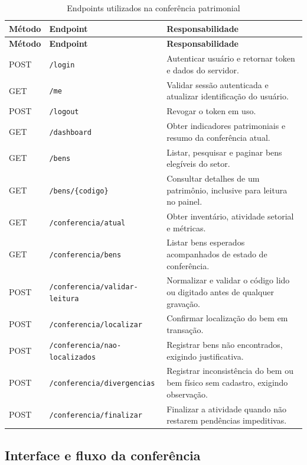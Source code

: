 \documentclass[12pt,a4paper]{article}
\begin{document}
\begin{longtable}{L{1.45cm} L{4.8cm} L{7.55cm}}
\caption{Endpoints utilizados na conferência patrimonial}
\label{tab:rotas}\\
\toprule
\textbf{Método} & \textbf{Endpoint} & \textbf{Responsabilidade} \\
\midrule
\endfirsthead
\toprule
\textbf{Método} & \textbf{Endpoint} & \textbf{Responsabilidade} \\
\midrule
\endhead
\bottomrule
\endfoot
POST & \texttt{/login} & Autenticar usuário e retornar token e dados do
servidor. \\
GET & \texttt{/me} & Validar sessão autenticada e atualizar identificação do
usuário. \\
POST & \texttt{/logout} & Revogar o token em uso. \\
GET & \texttt{/dashboard} & Obter indicadores patrimoniais e resumo da
conferência atual. \\
GET & \texttt{/bens} & Listar, pesquisar e paginar bens elegíveis do setor. \\
GET & \texttt{/bens/\{codigo\}} & Consultar detalhes de um patrimônio,
inclusive para leitura no painel. \\
GET & \texttt{/conferencia/atual} & Obter inventário, atividade setorial e
métricas. \\
GET & \texttt{/conferencia/bens} & Listar bens esperados acompanhados de
estado de conferência. \\
POST & \texttt{/conferencia/validar-leitura} & Normalizar e validar o código
lido ou digitado antes de qualquer gravação. \\
POST & \texttt{/conferencia/localizar} & Confirmar localização do bem em
transação. \\
POST & \texttt{/conferencia/nao-localizados} & Registrar bens não encontrados,
exigindo justificativa. \\
POST & \texttt{/conferencia/divergencias} & Registrar inconsistência do bem
ou bem físico sem cadastro, exigindo observação. \\
POST & \texttt{/conferencia/finalizar} & Finalizar a atividade quando não
restarem pendências impeditivas. \\
\end{longtable}

\subsection{Interface e fluxo da conferência}
\end{document}
